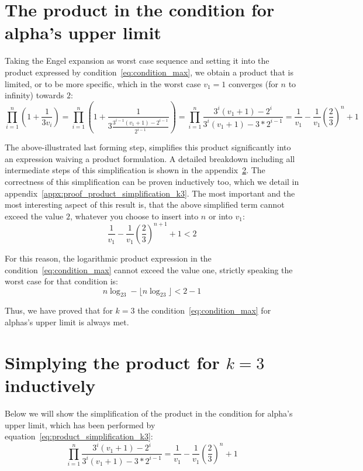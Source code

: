 \section{The product in the condition for alpha's upper limit}
Taking the Engel expansion as worst case sequence and setting it into the product expressed by condition~\ref{eq:condition_max}, we obtain a product that is limited, or to be more specific, which in the worst case $v_1=1$ converges (for $n$ to infinity) towards $2$:
\begin{equation}
\label{eq:product_simplification_k3}
\prod_{i=1}^{n}\left(1+\frac{1}{3v_{i}}\right)
=\prod_{i=1}^{n}\left(1+\frac{1}{3\frac{3^{i-1}(v_1+1)-2^{i-1}}{2^{i-1}}}\right)
=\prod_{i=1}^{n}\frac{3^i(v_1+1)-2^i}{3^i(v_1+1)-3*2^{i-1}}
=\frac{1}{v_1}-\frac{1}{v_1}\left(\frac{2}{3}\right)^n+1
\end{equation}

The above-illustrated last forming step, simplifies this product significantly into an expression waiving a product formulation. A detailed breakdown including all intermediate steps of this simplification is shown in the appendix~\ref{appx:product_simplification_k3}. The correctness of this simplification can be proven inductively too, which we detail in appendix~\ref{appx:proof_product_simplification_k3}. The most important and the most interesting aspect of this result is, that the above simplified term cannot exceed the value $2$, whatever you choose to insert into $n$ or into $v_1$:
\[
\frac{1}{v_1}-\frac{1}{v_1}\left(\frac{2}{3}\right)^{n+1}+1<2
\]

For this reason, the logarithmic product expression in the condition~\ref{eq:condition_max} cannot exceed the value one, strictly speaking the worst case for that condition is:
\[
n\log_23-\lfloor n\log_23\rfloor<2-1
\]

Thus, we have proved that for $k=3$ the condition~\ref{eq:condition_max} for alphas's upper limit is always met.

\section{Simplying the product for $k=3$ inductively}
\label{appx:product_simplification_k3}
Below we will show the simplification of the product in the condition for alpha's upper limit, which has been performed by equation~\ref{eq:product_simplification_k3}:
\[
\prod_{i=1}^{n}\frac{3^i(v_1+1)-2^i}{3^i(v_1+1)-3*2^{i-1}}
=\frac{1}{v_1}-\frac{1}{v_1}\left(\frac{2}{3}\right)^n+1
\]

